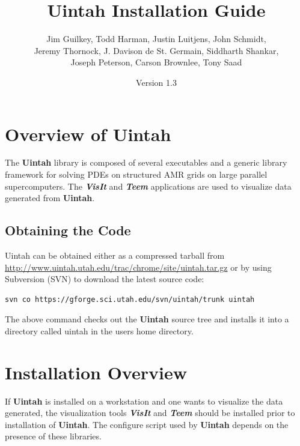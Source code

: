 \documentclass[12pt]{article}
\begin{document}
\title{Uintah Installation Guide}

\author{Jim Guilkey, Todd Harman, Justin Luitjens, John Schmidt,
  \\ Jeremy Thornock,
  J. Davison de St. Germain, Siddharth Shankar, \\
  Joseph Peterson,  
  Carson Brownlee,
  Tony Saad}

\date{Version 1.3}

\maketitle



\newpage

\tableofcontents

\newpage

\section{Overview of Uintah} \label{sec:overview}
The \textbf{Uintah} library is composed of several executables and a
generic library framework for solving PDEs on structured AMR grids on
large parallel supercomputers. The \textbf{\emph{VisIt}} and
\textbf{\emph{Teem}} applications are used to visualize data generated
from \textbf{Uintah}.

\subsection{Obtaining the Code}
Uintah can be obtained either as a compressed tarball from
\url{http://www.uintah.utah.edu/trac/chrome/site/uintah.tar.gz} or by using
Subversion (SVN) to download the latest source code:

\begin{verbatim}
svn co https://gforge.sci.utah.edu/svn/uintah/trunk uintah
\end{verbatim}

The above command checks out the \textbf{Uintah} source tree and
installs it into a directory called uintah in the users home
directory.


\section{Installation Overview}

If \textbf{Uintah} is installed on a workstation and one wants to
visualize the data generated, the visualization tools
\textbf{\emph{VisIt}} and \textbf{\emph{Teem}} should be installed
prior to installation of \textbf{Uintah}.  The configure script used by
\textbf{Uintah} depends on the presence of these libraries.
\end{document}
